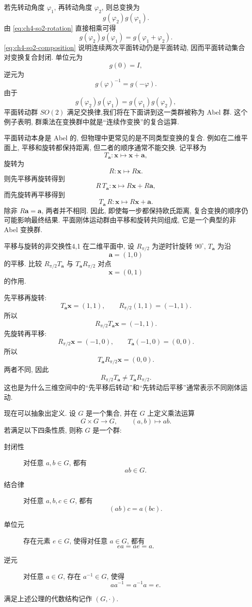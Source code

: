 若先转动角度 $\varphi_1$, 再转动角度 $\varphi_2$, 则总变换为
\[
g(\varphi_2)g(\varphi_1).
\]
由 \eqref{eq:ch4-so2-rotation} 直接相乘可得
\begin{equation}
\label{eq:ch4-so2-composition}
g(\varphi_2)g(\varphi_1)=g(\varphi_1+\varphi_2).
\end{equation}
\eqref{eq:ch4-so2-composition} 说明连续两次平面转动仍是平面转动, 因而平面转动集合对变换复合封闭. 单位元为
\[
g(0)=I,
\]
逆元为
\[
g(\varphi)^{-1}=g(-\varphi).
\]
由于
\[
g(\varphi_2)g(\varphi_1)=g(\varphi_1)g(\varphi_2),
\]
平面转动群 $SO(2)$ 满足交换律,我们将在下面讲到这一类群被称为 Abel 群. 这个例子表明, 群乘法在变换群中就是“连续作变换”的复合运算. 

平面转动本身是 Abel 的, 但物理中更常见的是不同类型变换的复合. 例如在二维平面上, 平移和旋转都保持距离, 但二者的顺序通常不能交换. 记平移为
\[
T_{\bm{a}}:\bm{x}\mapsto \bm{x}+\bm{a},
\]
旋转为
\[
R:\bm{x}\mapsto R\bm{x}.
\]
则先平移再旋转得到
\[
R\,T_{\bm{a}}:\bm{x}\mapsto R\bm{x}+R\bm{a},
\]
而先旋转再平移得到
\[
T_{\bm{a}}\,R:\bm{x}\mapsto R\bm{x}+\bm{a}.
\]
除非 $R\bm{a}=\bm{a}$, 两者并不相同. 因此, 即使每一步都保持欧氏距离, 复合变换的顺序仍可能影响最终结果. 平面刚体运动群由平移和旋转共同组成, 它是一个典型的非 Abel 变换群. 

\begin{example}{平移与旋转的非交换性}{4,1}
在二维平面中, 设 $R_{\pi/2}$ 为逆时针旋转 $90^\circ$, $T_{\bm{a}}$ 为沿
\[
\bm{a}=(1,0)
\]
的平移. 比较 $R_{\pi/2}T_{\bm{a}}$ 与 $T_{\bm{a}}R_{\pi/2}$ 对点
\[
\bm{x}=(0,1)
\]
的作用. 
\begin{solution}
先平移再旋转:
\[
T_{\bm{a}}\bm{x}=(1,1),
\qquad
R_{\pi/2}(1,1)=(-1,1).
\]
所以
\[
R_{\pi/2}T_{\bm{a}}\bm{x}=(-1,1).
\]
先旋转再平移:
\[
R_{\pi/2}\bm{x}=(-1,0),
\qquad
T_{\bm{a}}(-1,0)=(0,0).
\]
所以
\[
T_{\bm{a}}R_{\pi/2}\bm{x}=(0,0).
\]
两者不同, 因此
\[
R_{\pi/2}T_{\bm{a}}\neq T_{\bm{a}}R_{\pi/2}.
\]
这也是为什么三维空间中的“先平移后转动”和“先转动后平移”通常表示不同刚体运动. 
\end{solution}
\end{example}

现在可以抽象出定义. 设 $G$ 是一个集合, 并在 $G$ 上定义乘法运算
\[
G\times G\to G,
\qquad
(a,b)\mapsto ab.
\]
若满足以下四条性质, 则称 $G$ 是一个群:

\begin{description}
	
\item[封闭性] 对任意 $a,b\in G$, 都有
\[
ab\in G.
\]
\item[结合律] 对任意 $a,b,c\in G$, 都有
\[
(ab)c=a(bc).
\]
\item[单位元] 存在元素 $e\in G$, 使得对任意 $a\in G$, 都有
\[
ea=ae=a.
\]
\item[逆元] 对任意 $a\in G$, 存在 $a^{-1}\in G$, 使得
\[
aa^{-1}=a^{-1}a=e.
\]
\end{description}
满足上述公理的代数结构记作 $(G,\cdot)$. 

